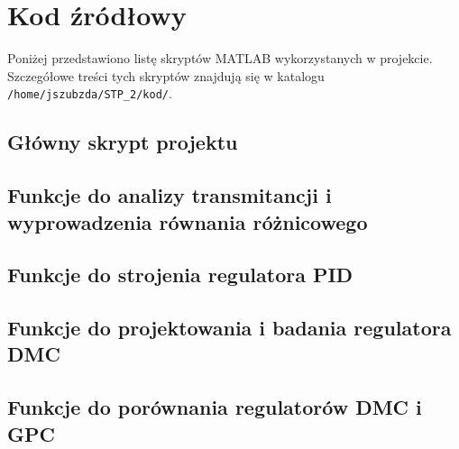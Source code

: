 \documentclass[a4paper,titlepage,11pt,floatssmall]{mwrep}
\begin{document}
\chapter{Kod źródłowy}

Poniżej przedstawiono listę skryptów MATLAB wykorzystanych w projekcie. Szczegółowe treści tych skryptów znajdują się w katalogu \texttt{/home/jszubzda/STP\_2/kod/}.

\section{Główny skrypt projektu}



\section{Funkcje do analizy transmitancji i wyprowadzenia równania różnicowego}





\section{Funkcje do strojenia regulatora PID}



\section{Funkcje do projektowania i badania regulatora DMC}





\section{Funkcje do porównania regulatorów DMC i GPC}
\end{document}
